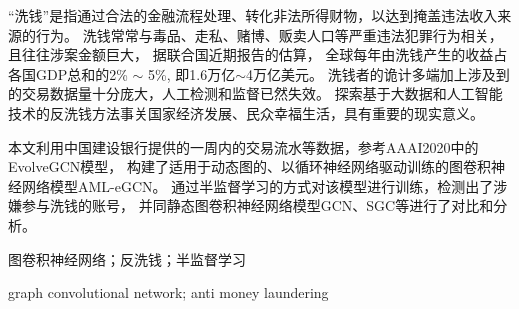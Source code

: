 

\begin{zhaiyao}
\begin{spacing}{1.5}
{
“洗钱”是指通过合法的金融流程处理、转化非法所得财物，以达到掩盖违法收入来源的行为。
洗钱常常与毒品、走私、赌博、贩卖人口等严重违法犯罪行为相关，且往往涉案金额巨大，
据联合国近期报告的估算，
全球每年由洗钱产生的收益占各国GDP总和的2\% $\sim$ 5\%,
即1.6万亿$\sim$4万亿美元。
洗钱者的诡计多端加上涉及到的交易数据量十分庞大，人工检测和监督已然失效。
探索基于大数据和人工智能技术的反洗钱方法事关国家经济发展、民众幸福生活，具有重要的现实意义。

本文利用中国建设银行提供的一周内的交易流水等数据，参考AAAI2020中的EvolveGCN模型，
构建了适用于动态图的、以循环神经网络驱动训练的图卷积神经网络模型AML-eGCN。
通过半监督学习的方式对该模型进行训练，检测出了涉嫌参与洗钱的账号，
并同静态图卷积神经网络模型GCN、SGC等进行了对比和分析。


}

\end{spacing}
\end{zhaiyao}


\begin{guanjianci}
图卷积神经网络；反洗钱；半监督学习 
\end{guanjianci}


\begin{abstract}
\begin{spacing}{1.5}
{
Money laundering refers to the act of processing and transforming illegally obtained property 
through legal financial processes to cover up the source of illegal income.
Money laundering is often related to serious illegal and criminal acts 
such as drugs, smuggling, gambling and human trafficking.
Besides, the amount involved is often huge.
According to recent United Nations' reports, the global annual income generated by money laundering accounts for 
2\% $\sim$ 5\% of the total GDP of all countries,
which is \$1.6 trillion to \$4 trillion dollars.
Tricks of money launderers, and the huge amount of transaction data make manual detection and supervision impossible.
Therefore, it is of great practical significance to explore 
anti money laundering methods based on big data and artificial intelligence technology, 
which is related to national economic development and people's happiness.


Referring to the EvolveGCN model proposed in AAAI2020, 
I construct a dynamic graph convolutional network called AML-eGCN 
which is driven by recurrent neural network  
to detect the suspected accounts in oneweek's transaction flow data provided by China Construction Bank.
The model is trained through semi-supervised method 
and compared to static graph convolutional network models like GCN and SGC in the paper.

}
    
\end{spacing}
\end{abstract}


\begin{keywords}
graph convolutional network; anti money laundering
\end{keywords} 